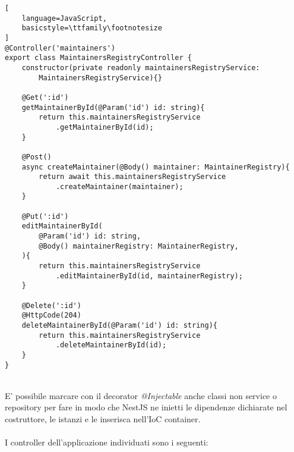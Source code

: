 \begin{lstlisting}[
    language=JavaScript,
    basicstyle=\ttfamily\footnotesize
]
@Controller('maintainers')
export class MaintainersRegistryController {
    constructor(private readonly maintainersRegistryService: 
        MaintainersRegistryService){}

    @Get(':id')
    getMaintainerById(@Param('id') id: string){
        return this.maintainersRegistryService
            .getMaintainerById(id);
    }

    @Post()
    async createMaintainer(@Body() maintainer: MaintainerRegistry){
        return await this.maintainersRegistryService
            .createMaintainer(maintainer);
    }

    @Put(':id')
    editMaintainerById(
        @Param('id') id: string,
        @Body() maintainerRegistry: MaintainerRegistry,
    ){
        return this.maintainersRegistryService
            .editMaintainerById(id, maintainerRegistry);
    }

    @Delete(':id')
    @HttpCode(204)
    deleteMaintainerById(@Param('id') id: string){
        return this.maintainersRegistryService
            .deleteMaintainerById(id);
    }
}
\end{lstlisting}
\leavevmode\newline
\\
E' possibile marcare con il decorator \textit{@Injectable}
anche classi non service o repository per fare in modo che NestJS ne inietti le dipendenze 
dichiarate nel costruttore, le istanzi e le inserisca nell'IoC container.
\\\\
I controller dell'applicazione individuati sono i seguenti:
